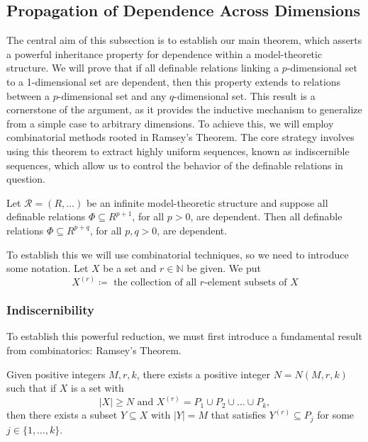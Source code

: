 \subsection{Propagation of Dependence Across Dimensions}

The central aim of this subsection is to establish our main theorem, which asserts a powerful inheritance property for dependence within a model-theoretic structure. We will prove that if all definable relations linking a $p$-dimensional set to a 1-dimensional set are dependent, then this property extends to relations between a $p$-dimensional set and any $q$-dimensional set. This result is a cornerstone of the argument, as it provides the inductive mechanism to generalize from a simple case to arbitrary dimensions. To achieve this, we will employ combinatorial methods rooted in Ramsey's Theorem. The core strategy involves using this theorem to extract highly uniform sequences, known as indiscernible sequences, which allow us to control the behavior of the definable relations in question.

\begin{theorem}{\label{thm:main-theorem-ch-2}}
    Let $\mathcal{R} = (R, \dots)$ be an infinite model-theoretic structure and suppose all definable relations $\Phi \subseteq R^{p+1}$, for all $p > 0$, are dependent. Then all definable relations $\Phi \subseteq R^{p+q}$, for all $p, q > 0$, are dependent.
\end{theorem}

To establish this we will use combinatorial techniques, so we need to introduce some notation. Let $X$ be a set and $r \in \mathbb{N}$ be given. We put
\[
    X^{(r)} \coloneq \text{ the collection of all $r$-element subsets of $X$}
\]

\subsubsection{Indiscernibility}

To establish this powerful reduction, we must first introduce a fundamental result from combinatorics: Ramsey's Theorem.

\begin{theorem}
    \label{thm:ramsey}
    Given positive integers $M, r, k$, there exists a positive integer $N = N(M, r, k)$ such that if $X$ is a set with
    \[
        |X| \ge N \text{ and } X^{(r)} = P_1 \cup P_2 \cup \dots \cup P_k,
    \]
    then there exists a subset $Y \subseteq X$ with $|Y| = M$ that satisfies $Y^{(r)} \subseteq P_j$ for some $j \in \{1, \dots, k\}$.
\end{theorem}



